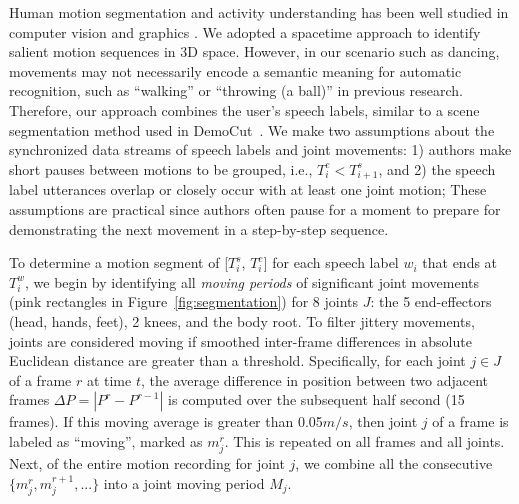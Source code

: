 Human motion segmentation and activity understanding has been well studied in computer vision and graphics \cite{Aggarwal:2011:HAA:1922649.1922653}. We adopted a spacetime approach to identify salient motion sequences in 3D space.
%
However, in our scenario such as dancing, movements may not necessarily encode a semantic meaning for automatic recognition, such as ``walking'' or ``throwing (a ball)'' in previous research. Therefore, our approach combines the user's speech labels, similar to a scene segmentation method used in DemoCut~\cite{Chi:2013:DGC:2501988.2502052}.
%
We make two assumptions about the synchronized data streams of speech labels and joint movements:
1) authors make short pauses between motions to be grouped, i.e., $T_i^e < T_{i+1}^s$, and
2) the speech label utterances overlap or closely occur with at least one joint motion;
%
These assumptions are practical since authors often pause for a moment to prepare for demonstrating the next movement in a step-by-step sequence.



To determine a motion segment of [$T_i^s$, $T_i^e$] for each speech label $w_i$ that ends at $T_i^w$, we begin by identifying all \emph{moving periods} of significant joint movements (pink rectangles in Figure~\ref{fig:segmentation}) for 8 joints $J$: the 5 end-effectors (head, hands, feet), 2 knees, and the body root.
%
To filter jittery movements, joints are considered moving if smoothed inter-frame differences in absolute Euclidean distance are greater than a threshold.
%
Specifically, for each joint $j \in J$ of a frame $r$ at time $t$, the average difference in position between two adjacent frames $\Delta P = |P^r-P^{r-1}|$ is computed over the subsequent half second (15 frames).
%
If this moving average is greater than 0.05$m/s$, then joint $j$ of a frame is labeled as ``moving'', marked as $m_j^r$.
This is repeated on all frames and all joints.
Next, of the entire motion recording for joint $j$, we combine all the consecutive $\{m_j^r, m_j^{r+1}, ...\}$ into a joint moving period $M_j$.

